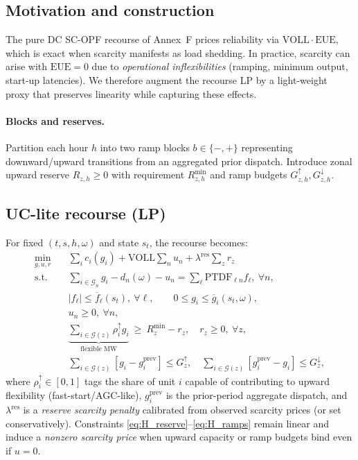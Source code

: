 \documentclass[11pt]{article}
\numberwithin{equation}{section}
\theoremstyle{definition}
\theoremstyle{remark}
\begin{document}
\subsection{ Motivation and construction}
The pure DC SC-OPF recourse of Annex~F prices reliability via $\mathrm{VOLL}\cdot\mathrm{EUE}$, which is exact when scarcity manifests as load shedding. In practice, scarcity can arise with $\mathrm{EUE}=0$ due to \emph{operational inflexibilities} (ramping, minimum output, start-up latencies). We therefore augment the recourse LP by a light-weight proxy that preserves linearity while capturing these effects.

\paragraph{Blocks and reserves.}
Partition each hour $h$ into two ramp blocks $b\in\{-,+\}$ representing downward/upward transitions from an aggregated prior dispatch. Introduce zonal upward reserve $R_{z,h}\ge 0$ with requirement $R^{\min}_{z,h}$ and ramp budgets $G^{\uparrow}_{z,h},G^{\downarrow}_{z,h}$.

\subsection{ UC-lite recourse (LP)}
For fixed $(t,s,h,\omega)$ and state $s_t$, the recourse becomes:
\begin{align}
\min_{g,u,r}\quad &
\sum_{i} c_i(g_i) + \mathrm{VOLL}\sum_n u_{n}
+ \lambda^{\mathrm{res}} \sum_z r_{z} \label{eq:H_obj}\\
\text{s.t.}\quad
& \sum_{i\in \mathcal G_n} g_i - d_{n}(\omega) - u_{n}
= \sum_{\ell}\mathrm{PTDF}_{\ell n} f_\ell,\ \forall n, \label{eq:H_balance}\\
& |f_\ell|\le \overline f_{\ell}(s_t),\ \forall \ell, \qquad 0\le g_i\le \overline g_i(s_t,\omega), \label{eq:H_limits}\\
& u_n\ge 0,\ \forall n, \\
& \underbrace{\sum_{i\in\mathcal G(z)} \rho_i^{\uparrow} g_i}_{\text{flexible MW}} \ \ge\ R^{\min}_{z} - r_z,\quad r_z\ge 0,\ \forall z, \label{eq:H_reserve}\\
& \sum_{i\in\mathcal G(z)} \left[g_i - g_i^{\mathrm{prev}}\right] \le G^{\uparrow}_{z},\quad
\sum_{i\in\mathcal G(z)} \left[g_i^{\mathrm{prev}} - g_i\right] \le G^{\downarrow}_{z}, \label{eq:H_ramps}
\end{align}
where $\rho_i^{\uparrow}\in[0,1]$ tags the share of unit $i$ capable of contributing to upward flexibility (fast-start/AGC-like), $g_i^{\mathrm{prev}}$ is the prior-period aggregate dispatch, and $\lambda^{\mathrm{res}}$ is a \emph{reserve scarcity penalty} calibrated from observed scarcity prices (or set conservatively). Constraints \eqref{eq:H_reserve}--\eqref{eq:H_ramps} remain linear and induce a \emph{nonzero scarcity price} when upward capacity or ramp budgets bind even if $u=0$.
\end{document}
